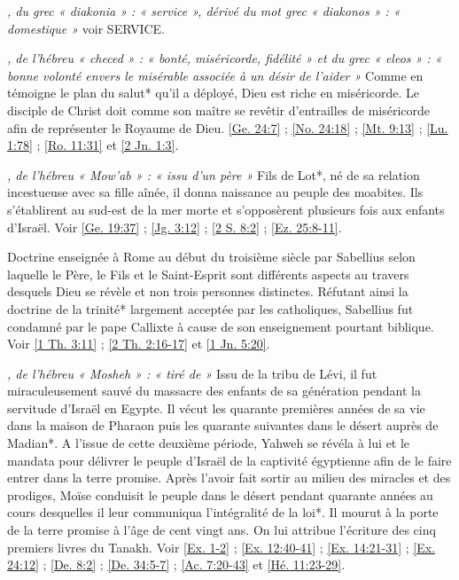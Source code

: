 \begin{multicols}{2}
\textit{, du grec « diakonia » : « service », dérivé du mot grec « diakonos » : « domestique »}\newline
voir SERVICE. 

\textit{, de l'hébreu « checed » : « bonté, miséricorde, fidélité » et du grec « eleos » : « bonne volonté envers le misérable associée à un désir de l'aider »}\newline
Comme en témoigne le plan du salut* qu'il a déployé, Dieu est riche en miséricorde. Le disciple de Christ doit comme son maître se revêtir d'entrailles de miséricorde afin de représenter le Royaume de Dieu. \vref{Ge. 24:7} ; \vref{No. 24:18} ; \vref{Mt. 9:13} ; \vref{Lu. 1:78} ; \vref{Ro. 11:31} et \vref{2 Jn. 1:3}.

\textit{, de l'hébreu « Mow'ab » : « issu d'un père »}\newline
Fils de Lot*, né de sa relation incestueuse avec sa fille aînée, il donna naissance au peuple des moabites. Ils s'établirent au sud-est de la mer morte et s'opposèrent plusieurs fois aux enfants d'Israël. Voir \vref{Ge. 19:37} ; \vref{Jg. 3:12} ; \vref{2 S. 8:2} ; \vref{Ez. 25:8-11}.

\textit{}\newline
Doctrine enseignée à Rome au début du troisième siècle par Sabellius selon laquelle le Père, le Fils et le Saint-Esprit sont différents aspects au travers desquels Dieu se révèle et non trois personnes distinctes. Réfutant ainsi la doctrine de la trinité* largement acceptée par les catholiques, Sabellius fut condamné par le pape Callixte à cause de son enseignement pourtant biblique. Voir \vref{1 Th. 3:11} ; \vref{2 Th. 2:16-17} et \vref{1 Jn. 5:20}.

\textit{, de l'hébreu « Mosheh » : « tiré de »}\newline
Issu de la tribu de Lévi, il fut miraculeusement sauvé du massacre des enfants de sa génération pendant la servitude d'Israël en Egypte. Il vécut les quarante premières années de sa vie dans la maison de Pharaon puis les quarante suivantes dans le désert auprès de Madian*. A l'issue de cette deuxième période, Yahweh se révéla à lui et le mandata pour délivrer le peuple d'Israël de la captivité égyptienne afin de le faire entrer dans la terre promise. Après l'avoir fait sortir au milieu des miracles et des prodiges, Moïse conduisit le peuple dans le désert pendant quarante années au cours desquelles il leur communiqua l'intégralité de la loi*. Il mourut à la porte de la terre promise à l'âge de cent vingt ans. On lui attribue l'écriture des cinq premiers livres du Tanakh. Voir \vref{Ex. 1-2} ; \vref{Ex. 12:40-41} ; \vref{Ex. 14:21-31} ; \vref{Ex. 24:12} ; \vref{De. 8:2} ; \vref{De. 34:5-7} ; \vref{Ac. 7:20-43} et \vref{Hé. 11:23-29}.


\end{multicols}
